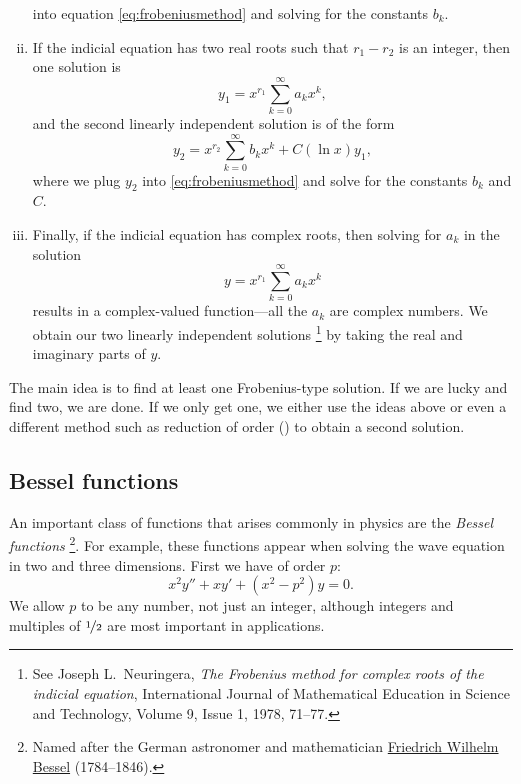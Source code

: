 \begin{enumerate}[(i)]
\begin{equation*}
\end{equation*}
into equation \eqref{eq:frobeniusmethod} and solving for the constants $b_k$.
\item
If the indicial equation has two real roots such that $r_1-r_2$ is
an integer, then one solution is
\begin{equation*}
y_1 = x^{r_1} \sum_{k=0}^\infty a_k x^{k} ,
\end{equation*}
and the second linearly independent solution is of the form
\begin{equation*}
y_2 = x^{r_2} \sum_{k=0}^\infty b_k x^{k} + C (\ln x) y_1 ,
\end{equation*}
where we plug $y_2$ into \eqref{eq:frobeniusmethod} and solve for the
constants $b_k$ and $C$.
\item
Finally, if the indicial equation has complex roots, then solving
for $a_k$ in the solution
\begin{equation*}
y = x^{r_1} \sum_{k=0}^\infty a_k x^{k}
\end{equation*}
results in a complex-valued function---all the $a_k$ are complex
numbers.  We obtain our two linearly independent
solutions%
\footnote{See 
Joseph L.\ Neuringera,
\emph{The Frobenius method for complex roots of the indicial equation},
International Journal of Mathematical Education in Science and Technology,
Volume 9, Issue 1, 1978, 71--77.}
by taking the real and imaginary parts of $y$.
\end{enumerate}

The main idea is to find at least one Frobenius-type solution.  If
we are lucky and find two, we are done.
If we only get one, we either use the ideas above or even a different method
such as reduction of order () to
obtain a second solution.

\subsection{Bessel functions}

An important class of functions that arises commonly in physics are the
\emph{Bessel functions}%
\footnote{Named after
the German astronomer and mathematician
\href{http://en.wikipedia.org/wiki/Friedrich_Bessel}{Friedrich Wilhelm
Bessel} (1784--1846).}.
For example, these functions appear when solving the
wave equation in two and three dimensions.  First we have 
\emph{} of order $p$:
\begin{equation*}
x^2 y'' + xy' + \left(x^2 - p^2\right)y = 0 .
\end{equation*}
We allow $p$ to be any number, not just an integer, although integers
and multiples of $\nicefrac{1}{2}$ are most important in applications.

